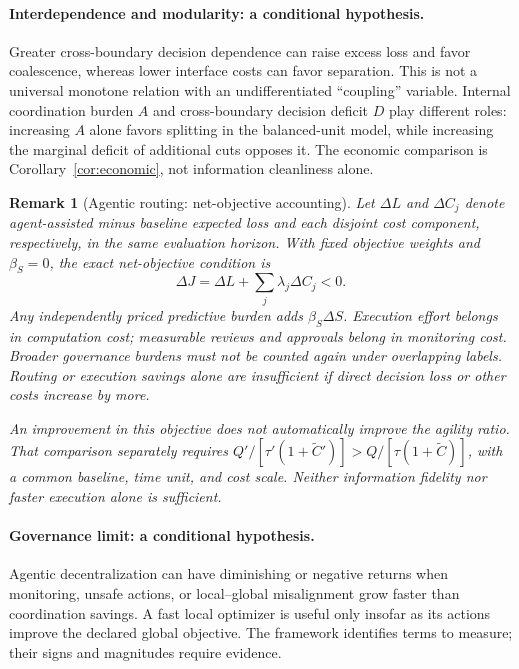 \documentclass[11pt]{article}
\newtheorem{remark}{Remark}
\begin{document}
\paragraph{Interdependence and modularity: a conditional hypothesis.}
Greater cross-boundary decision dependence can raise excess loss and favor
coalescence, whereas lower interface costs can favor separation. This is not a
universal monotone relation with an undifferentiated ``coupling'' variable.
Internal coordination burden $A$ and cross-boundary decision deficit $D$ play
different roles: increasing $A$ alone favors splitting in the balanced-unit
model, while increasing the marginal deficit of additional cuts opposes it.
The economic comparison is Corollary~\ref{cor:economic}, not information
cleanliness alone.

\begin{remark}[Agentic routing: net-objective accounting]
Let $\Delta L$ and $\Delta C_j$ denote agent-assisted minus baseline expected
loss and each disjoint cost component, respectively, in the same evaluation
horizon. With fixed objective weights and $\beta_S=0$, the exact net-objective
condition is
\[
\Delta J=\Delta L+\sum_j\lambda_j\Delta C_j<0.
\]
Any independently priced predictive burden adds $\beta_S\Delta S$.
Execution effort belongs in computation cost; measurable reviews and approvals
belong in monitoring cost. Broader governance burdens must not be counted again
under overlapping labels. Routing or execution savings alone are insufficient
if direct decision loss or other costs increase by more.

An improvement in this objective does not automatically improve the agility
ratio. That comparison separately requires
$Q'/[\tau'(1+\widetilde C')]>Q/[\tau(1+\widetilde C)]$, with a common
baseline, time unit, and cost scale. Neither information fidelity nor faster
execution alone is sufficient.
\end{remark}

\paragraph{Governance limit: a conditional hypothesis.}
Agentic decentralization can have diminishing or negative returns when
monitoring, unsafe actions, or local--global misalignment grow faster than
coordination savings. A fast local optimizer is useful only insofar as its
actions improve the declared global objective. The framework identifies terms
to measure; their signs and magnitudes require evidence.
\end{document}
